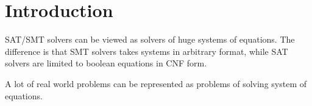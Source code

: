 \section{Introduction}

SAT/SMT solvers can be viewed as solvers of huge systems of equations.
The difference is that SMT solvers takes systems in arbitrary format,
while SAT solvers are limited to boolean equations in CNF form.

A lot of real world problems can be represented as problems of solving system of equations.

